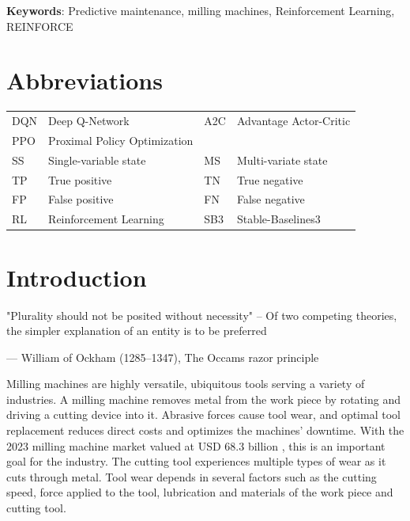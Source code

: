 \documentclass[a4paper, 12pt]{article}
\newcommand{\rowspace}[1]{\renewcommand{\arraystretch}{#1}}
\begin{document}
\noindent \textbf{Keywords}: Predictive maintenance, milling machines, Reinforcement Learning, REINFORCE

\section*{Abbreviations}

\begin{table}[!htbp]\centering
	\sffamily
	\rowspace{1.3}
	\begin{tabular}{L{1cm} L{4.5cm} L{1cm} L{4.5cm}}
		\toprule	
		
		DQN & Deep Q-Network & A2C & Advantage Actor-Critic\\
		PPO & Proximal Policy Optimization & & \\
		SS & Single-variable state & MS & Multi-variate state\\
		TP &True positive &TN &True negative\\
		FP &False positive &FN &False negative\\
		RL & Reinforcement Learning & SB3 & Stable-Baselines3\\

		\bottomrule
	\end{tabular}
	\label{tbl:abbrev}
\end{table}

\newpage
\section{Introduction}
\epigraph{"Plurality should not be posited without necessity" -- Of two competing theories, the simpler explanation of an entity is to be preferred}{--- \textup{William of Ockham (1285–1347)}, The Occams razor principle}

\noindent Milling machines are highly versatile, ubiquitous tools serving a variety of industries. A milling machine removes metal from the work piece by rotating and driving a cutting device into it. Abrasive forces cause tool wear, and optimal tool replacement reduces direct costs and optimizes the machines' downtime. With the 2023 milling machine market valued at USD 68.3 billion \citep{milling-market}, this is an important goal for the industry. The cutting tool experiences multiple types of wear as it cuts through metal. Tool wear depends in several factors such as the cutting speed, force applied to the tool, lubrication and materials of the work piece and cutting tool. 
\end{document}
